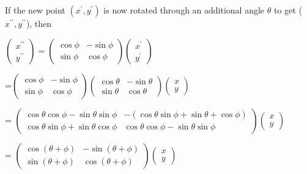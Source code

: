 \documentclass{book}
\begin{document}
\begin{itemize}
					If the new point $(x^\prime , y^\prime)$ is now rotated through an additional angle $\theta$ to get ($x^{\prime\prime} , y^{\prime\prime}$), then

			\hspace{3cm}$\begin{pmatrix} x^{\prime\prime} \\
y^{\prime\prime}\end{pmatrix} = \begin{pmatrix} \cos\phi & -\sin\phi \\
\sin\phi & \cos\phi \end{pmatrix} \begin{pmatrix} x^\prime \\
y^\prime \end{pmatrix}$


			\hspace{4cm} =$ \begin{pmatrix} \cos\phi & -\sin\phi \\
\sin\phi & \cos\phi \end{pmatrix} \begin{pmatrix} \cos\theta & -\sin\theta \\
\sin\theta & \cos\theta \end{pmatrix} \begin{pmatrix} x \\
y \end{pmatrix}$

			\hspace{4cm}			= $\begin{pmatrix} \cos\theta\cos\phi-\sin\theta\sin\phi & -(\cos\theta\sin\phi + \sin\theta + \cos\phi)\\
				\cos\theta\sin\phi + \sin\theta\cos\phi & \cos\theta\cos\phi - \sin\theta\sin\phi \end{pmatrix} \begin{pmatrix} x \\ y\end{pmatrix} $

					\hspace{4cm}	= $\begin{pmatrix} \cos(\theta + \phi) &-\sin(\theta + \phi) \\
						\sin(\theta + \phi) & \cos(\theta + \phi) \end{pmatrix} \begin{pmatrix} x \\ y\end{pmatrix}$




\end{itemize}
\end{document}
